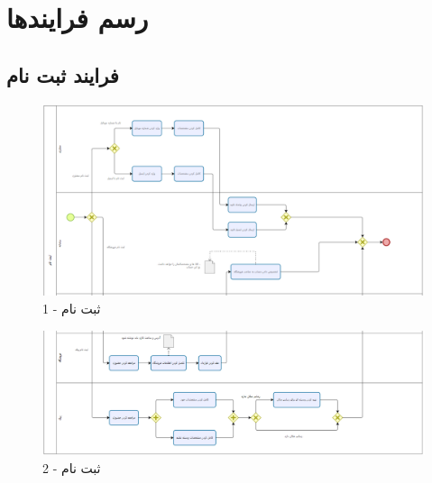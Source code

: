 \documentclass[12pt,a4paper]{article}
\begin{document}
\maketitle
\pagebreak
\tableofcontents
\pagebreak
\listoffigures
\pagebreak
\normalsize	



\pagebreak
\section{رسم فرایندها} \label{section.function}

\subsection{فرایند ثبت نام} \label{section.function.register}
	
	\begin{figure}[h!]
		\begin{center}
			\includegraphics[width=14cm]{images/Bizagi Register 1.png}	
		\end{center}
		\caption{ثبت نام - 1}
	\end{figure}
	\begin{figure}[h!]
		\begin{center}
			\includegraphics[width=14cm]{images/Bizagi Register 2.png}	
		\end{center}
		\caption{ثبت نام - 2}
	\end{figure}
	
\end{document}

